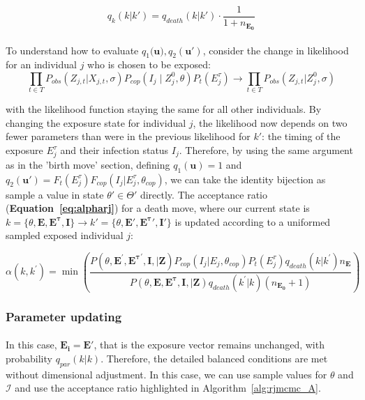 \begin{equation}
q_k(k | k') = q_{death}(k | k')\cdot \frac{1}{1 + n_{\mathbf{E_0}}}
\end{equation}


\paragraph{}To understand how to evaluate $q_1(\mathbf{u)}, q_2(\mathbf{u}')$, consider the change in likelihood for an individual $j$ who is chosen to be exposed:
\begin{equation}
 \prod_{t \in T}P_{obs}(Z_{j,t}|X_{j,t}, \sigma)P_{cop}(I_j \mid  Z^0_{j}, \theta)P_t(E_j^\tau) \rightarrow \prod_{t \in T}P_{obs}(Z_{j,t}|Z^0_{j}, \sigma) 
\end{equation}

with the likelihood function staying the same for all other individuals. By changing the exposure state for individual $j$, the likelihood now depends on two fewer parameters than were in the previous likelihood for $k'$: the timing of the exposure $E^\tau_j$ and their infection status $I_j$. Therefore, by using the same argument as in the 'birth move' section, defining $q_1(\mathbf{u}) = 1$ and $q_2(\mathbf{u}') = F_t(E^\tau_j)F_{cop}(I_j | E_j^\tau, \theta_{cop})$, we can take the identity bijection as sample a value in state $\theta' \in \Theta'$ directly.  The acceptance ratio (\textbf{Equation~\ref{eq:alpharj}}) for a death move, where our current state is $k = \{\theta, \mathbf{E}, \mathbf{E^\tau}, \mathbf{I}\} \rightarrow k' = \{\theta, \mathbf{E}', \mathbf{E^\tau}', \mathbf{I}'\}$ is updated according to a uniformed sampled exposed individual $j$:

\begin{equation}
\label{acc:death}
\alpha(k, k^{\prime}) = \min\left(\frac{P(\theta, \mathbf{E}^{\prime}, \mathbf{E^{\tau}}^{\prime}, \mathbf{I}, | \mathbf{Z})P_{cop}(I_{j} | E_{j}, \theta_{cop})P_t(E^\tau_j)q_{death}(k|k^{\prime})n_{\mathbf{E}}}{P(\theta, \mathbf{E}, \mathbf{E^{\tau}}, \mathbf{I}, | \mathbf{Z})q_{death}(k^{\prime}|k)(n_{\mathbf{E_0}} + 1)} \right)
\end{equation}

\subsubsection{Parameter updating}


\paragraph{}In this case, $\mathbf{E_i} = \mathbf{E'}$, that is the exposure vector remains unchanged, with probability $q_{par}(k|k)$. Therefore, the detailed balanced conditions are met without dimensional adjustment. In this case, we can use sample values for $\theta$ and $\mathcal{I}$ and use the acceptance ratio highlighted in Algorithm~\ref{alg:rjmcmc_A}.

